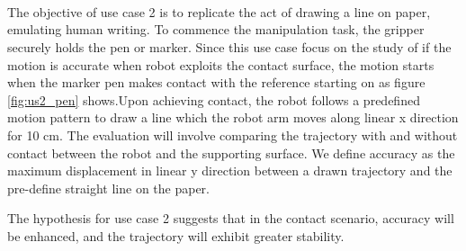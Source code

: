 \documentclass[report.tex]{subfiles}
\begin{document}
    \paragraph{\\}
    The objective of use case 2 is to replicate the act of drawing a line on paper, emulating human writing. To commence the manipulation task, the gripper securely holds the pen or marker. Since this use case focus on the study of if the motion is accurate when robot exploits the contact surface, the motion starts when the marker pen makes contact with the reference starting on as figure \ref{fig:us2_pen} shows.Upon achieving contact, the robot follows a predefined motion pattern to draw a line which the robot arm moves along linear x direction for 10 cm.
    The evaluation will involve comparing the trajectory with and without contact between the robot and the supporting surface. We define accuracy as the maximum displacement in linear y direction between a drawn trajectory and the pre-define straight line on the paper.
    
    The hypothesis for use case 2 suggests that in the contact scenario, accuracy will be enhanced, and the trajectory will exhibit greater stability.
    \raggedbottom
\end{document}
